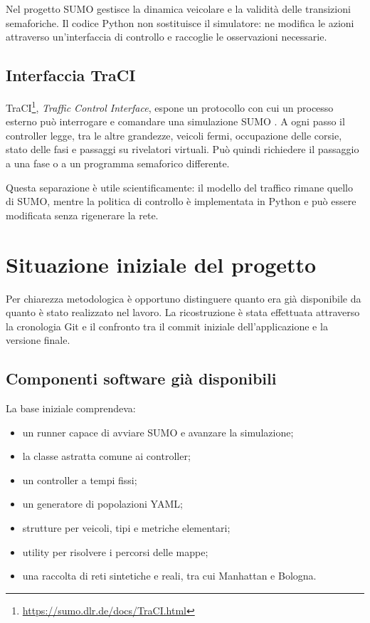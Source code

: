 \documentclass[12pt,a4paper,oneside]{report}
\numberwithin{equation}{chapter}
\begin{document}
Nel progetto SUMO gestisce la dinamica veicolare e la validità delle transizioni
semaforiche. Il codice Python non sostituisce il simulatore: ne modifica le
azioni attraverso un'interfaccia di controllo e raccoglie le osservazioni
necessarie.

\subsection{Interfaccia TraCI}

TraCI\footnote{\url{https://sumo.dlr.de/docs/TraCI.html}}, \emph{Traffic Control Interface}, espone un protocollo con cui un
processo esterno può interrogare e comandare una simulazione SUMO
\cite{wegener2008traci,tracidocs2026}. A ogni passo il controller legge, tra le
altre grandezze, veicoli fermi, occupazione delle corsie, stato delle fasi e
passaggi su rivelatori virtuali. Può quindi richiedere il passaggio a una fase
o a un programma semaforico differente.

Questa separazione è utile scientificamente: il modello del traffico rimane
quello di SUMO, mentre la politica di controllo è implementata in Python e può
essere modificata senza rigenerare la rete.

\section{Situazione iniziale del progetto}

Per chiarezza metodologica è opportuno distinguere quanto era già disponibile
da quanto è stato realizzato nel lavoro. La ricostruzione è stata effettuata
attraverso la cronologia Git e il confronto tra il commit iniziale
dell'applicazione e la versione finale.

\subsection{Componenti software già disponibili}

La base iniziale comprendeva:

\begin{itemize}
    \item un runner capace di avviare SUMO e avanzare la simulazione;
    \item la classe astratta comune ai controller;
    \item un controller a tempi fissi;
    \item un generatore di popolazioni YAML;
    \item strutture per veicoli, tipi e metriche elementari;
    \item utility per risolvere i percorsi delle mappe;
    \item una raccolta di reti sintetiche e reali, tra cui Manhattan e Bologna.
\end{itemize}
\end{document}
